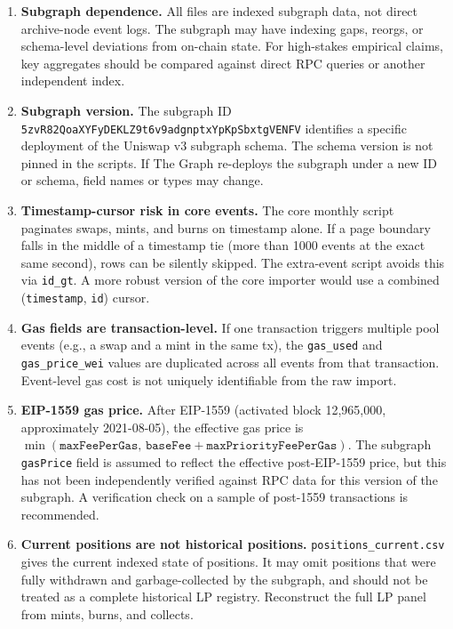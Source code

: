 \documentclass[11pt,a4paper]{article}
\begin{document}
\begin{enumerate}
  \item \textbf{Subgraph dependence.} All files are indexed subgraph data,
        not direct archive-node event logs. The subgraph may have indexing
        gaps, reorgs, or schema-level deviations from on-chain state. For
        high-stakes empirical claims, key aggregates should be compared
        against direct RPC queries or another independent index.

  \item \textbf{Subgraph version.} The subgraph ID
        \texttt{5zvR82QoaXYFyDEKLZ9t6v9adgnptxYpKpSbxtgVENFV} identifies a
        specific deployment of the Uniswap v3 subgraph schema. The schema
        version is not pinned in the scripts. If The Graph re-deploys the
        subgraph under a new ID or schema, field names or types may change.

  \item \textbf{Timestamp-cursor risk in core events.} The core monthly
        script paginates swaps, mints, and burns on timestamp alone.
        If a page boundary falls in the middle of a timestamp tie
        (more than 1000 events at the exact same second), rows can be
        silently skipped. The extra-event script avoids this via
        \texttt{id\_gt}. A more robust version of the core importer would
        use a combined (\texttt{timestamp}, \texttt{id}) cursor.

  \item \textbf{Gas fields are transaction-level.} If one transaction
        triggers multiple pool events (e.g., a swap and a mint in the same
        tx), the \texttt{gas\_used} and \texttt{gas\_price\_wei} values are
        duplicated across all events from that transaction. Event-level gas
        cost is not uniquely identifiable from the raw import.

  \item \textbf{EIP-1559 gas price.} After EIP-1559 (activated block
        12{,}965{,}000, approximately 2021-08-05), the effective gas price
        is $\min(\texttt{maxFeePerGas},\, \texttt{baseFee} +
        \texttt{maxPriorityFeePerGas})$. The subgraph \texttt{gasPrice}
        field is assumed to reflect the effective post-EIP-1559 price,
        but this has not been independently verified against RPC data
        for this version of the subgraph. A verification check on a
        sample of post-1559 transactions is recommended.

  \item \textbf{Current positions are not historical positions.}
        \texttt{positions\_current.csv} gives the current indexed state of
        positions. It may omit positions that were fully withdrawn and
        garbage-collected by the subgraph, and should not be treated as a
        complete historical LP registry. Reconstruct the full LP panel from
        mints, burns, and collects.


\end{enumerate}
\end{document}

